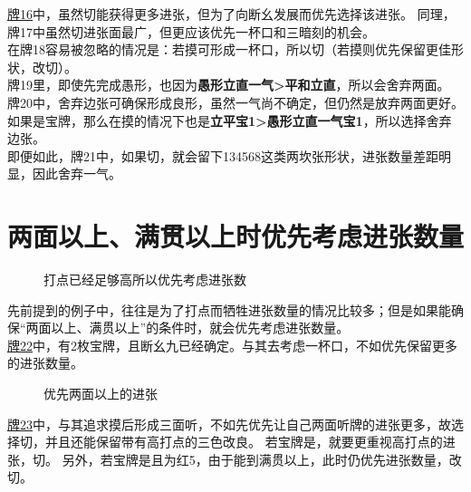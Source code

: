\hyperlink{lec6:pai16-21}{牌16}中，虽然切能获得更多进张，但为了向断幺发展而优先选择该进张。
同理，牌17中虽然切进张面最广，但更应该优先一杯口和三暗刻的机会。\\
在牌18容易被忽略的情况是：若摸可形成一杯口，所以切（若摸则优先保留更佳形状，改切）。\\
牌19里，即使先完成愚形，也因为\textbf{愚形立直一气>平和立直}，所以会舍弃两面。\\
牌20中，舍弃边张可确保形成良形，虽然一气尚不确定，但仍然是放弃两面更好。如果是宝牌，那么在摸的情况下也是\textbf{立平宝1>愚形立直一气宝1}，所以选择舍弃边张。\\
即便如此，牌21中，如果切，就会留下134568这类两坎张形状，进张数量差距明显，因此舍弃一气。

\section{两面以上、满贯以上时优先考虑进张数量}
\begin{figure}[h]
    \caption{打点已经足够高所以优先考虑进张数}
    \label{lec6:pai22}
\end{figure}
先前提到的例子中，往往是为了打点而牺牲进张数量的情况比较多；但是如果能确保“两面以上、满贯以上”的条件时，就会优先考虑进张数量。\\
\hyperlink{lec6:pai22}{牌22}中，有2枚宝牌，且断幺九已经确定。与其去考虑一杯口，不如优先保留更多的进张数量。\\
\begin{figure}[h]
    \caption{优先两面以上的进张}
    \label{lec6:pai23}
\end{figure}
\hyperlink{lec6:pai23}{牌23}中，与其追求摸后形成三面听，不如先优先让自己两面听牌的进张更多，故选择切，并且还能保留带有高打点的三色改良。
若宝牌是，就要更重视高打点的进张，切。
另外，若宝牌是且为红5，由于能到满贯以上，此时仍优先进张数量，改切。

